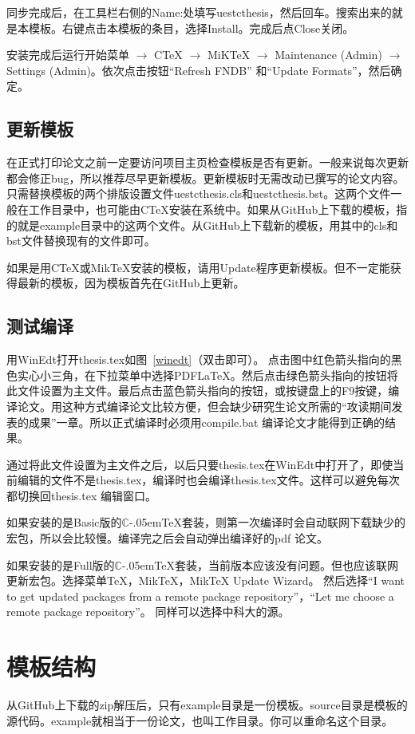 同步完成后，在工具栏右侧的Name:处填写uestcthesis，然后回车。搜索出来的就是本模板。右键点击本模板的条目，选择Install。完成后点Close关闭。

安装完成后运行开始菜单 $\longrightarrow$ CTeX $\longrightarrow$ MiKTeX $\longrightarrow$ Maintenance (Admin) $\longrightarrow$ Settings (Admin)。依次点击按钮“Refresh FNDB” 和“Update Formats”，然后确定。
\subsection{更新模板}
在正式打印论文之前一定要访问项目主页检查模板是否有更新。一般来说每次更新都会修正bug，所以推荐尽早更新模板。更新模板时无需改动已撰写的论文内容。只需替换模板的两个排版设置文件uestcthesis.cls和uestcthesis.bst。这两个文件一般在工作目录中，也可能由CTeX安装在系统中。如果从GitHub上下载的模板，指的就是example目录中的这两个文件。从GitHub上下载新的模板，用其中的cls和bst文件替换现有的文件即可。

如果是用CTeX或MikTeX安装的模板，请用Update程序更新模板。但不一定能获得最新的模板，因为模板首先在GitHub上更新。
\subsection{测试编译}
用WinEdt打开thesis.tex如图~\ref{winedt}（双击即可）。
点击图中红色箭头指向的黑色实心小三角，在下拉菜单中选择PDFLaTeX。然后点击绿色箭头指向的按钮将此文件设置为主文件。最后点击蓝色箭头指向的按钮，或按键盘上的F9按键，编译论文。用这种方式编译论文比较方便，但会缺少研究生论文所需的“攻读期间发表的成果”一章。所以正式编译时必须用compile.bat 编译论文才能得到正确的结果。

通过将此文件设置为主文件之后，以后只要thesis.tex在WinEdt中打开了，即使当前编辑的文件不是thesis.tex，编译时也会编译thesis.tex文件。这样可以避免每次都切换回thesis.tex 编辑窗口。

如果安装的是Basic版的$\mathbb{C}$\kern-.05em\TeX{}套装，则第一次编译时会自动联网下载缺少的宏包，所以会比较慢。编译完之后会自动弹出编译好的pdf 论文。

如果安装的是Full版的$\mathbb{C}$\kern-.05em\TeX{}套装，当前版本应该没有问题。但也应该联网更新宏包。选择菜单TeX，MikTeX，MikTeX Update Wizard。 然后选择“I want to get updated packages from a remote package repository”，“Let me choose a remote package repository”。 同样可以选择中科大的源。
\section{模板结构}\label{templatestructure}
从GitHub上下载的zip解压后，只有example目录是一份模板。source目录是模板的源代码。example就相当于一份论文，也叫工作目录。你可以重命名这个目录。

